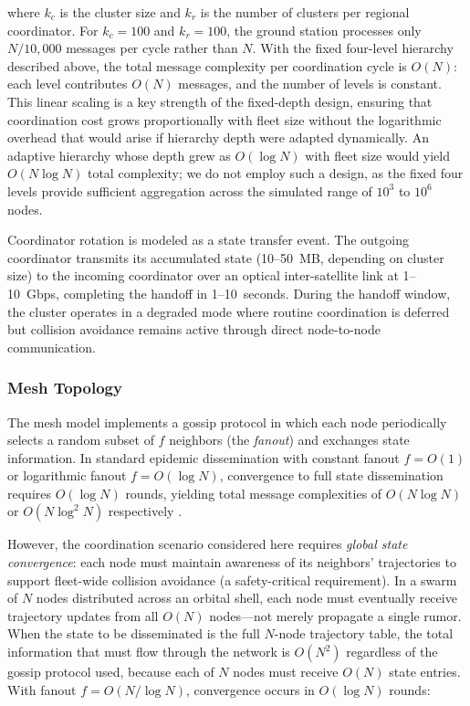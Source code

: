 \documentclass[journal]{IEEEtran}
\begin{document}
\noindent where $k_c$ is the cluster size and $k_r$ is the number of clusters per regional coordinator. For $k_c = 100$ and $k_r = 100$, the ground station processes only $N/10{,}000$ messages per cycle rather than $N$. With the fixed four-level hierarchy described above, the total message complexity per coordination cycle is $O(N)$: each level contributes $O(N)$ messages, and the number of levels is constant. This linear scaling is a key strength of the fixed-depth design, ensuring that coordination cost grows proportionally with fleet size without the logarithmic overhead that would arise if hierarchy depth were adapted dynamically. An adaptive hierarchy whose depth grew as $O(\log N)$ with fleet size would yield $O(N \log N)$ total complexity; we do not employ such a design, as the fixed four levels provide sufficient aggregation across the simulated range of $10^3$ to $10^6$ nodes.

Coordinator rotation is modeled as a state transfer event. The outgoing coordinator transmits its accumulated state (10--50~MB, depending on cluster size) to the incoming coordinator over an optical inter-satellite link at 1--10~Gbps, completing the handoff in 1--10~seconds. During the handoff window, the cluster operates in a degraded mode where routine coordination is deferred but collision avoidance remains active through direct node-to-node communication.

\subsubsection{Mesh Topology}

The mesh model implements a gossip protocol in which each node periodically selects a random subset of $f$ neighbors (the \emph{fanout}) and exchanges state information. In standard epidemic dissemination with constant fanout $f = O(1)$ or logarithmic fanout $f = O(\log N)$, convergence to full state dissemination requires $O(\log N)$ rounds, yielding total message complexities of $O(N \log N)$ or $O(N \log^2 N)$ respectively \cite{demers_gossip}.

However, the coordination scenario considered here requires \emph{global state convergence}: each node must maintain awareness of its neighbors' trajectories to support fleet-wide collision avoidance (a safety-critical requirement). In a swarm of $N$ nodes distributed across an orbital shell, each node must eventually receive trajectory updates from all $O(N)$ nodes---not merely propagate a single rumor. When the state to be disseminated is the full $N$-node trajectory table, the total information that must flow through the network is $O(N^2)$ regardless of the gossip protocol used, because each of $N$ nodes must receive $O(N)$ state entries. With fanout $f = O(N / \log N)$, convergence occurs in $O(\log N)$ rounds:
\end{document}
